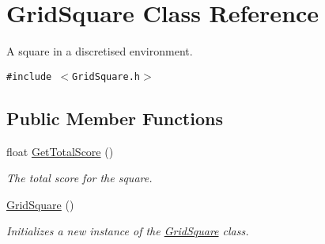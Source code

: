 \hypertarget{class_grid_square}{
\section{Grid\-Square Class Reference}
\label{class_grid_square}
}
A square in a discretised environment.  


{\tt \#include $<$Grid\-Square.h$>$}

\subsection*{Public Member Functions}
\begin{CompactItemize}
\item 
float \hyperlink{class_grid_square_6fdbfeb74b4d71ab4c3a2c57e003ccce}{Get\-Total\-Score} ()
\begin{CompactList}\small\item\em The total score for the square. \item\end{CompactList}\item 
\hyperlink{class_grid_square_17522bbd8d99669f23ce79cc016ff945}{Grid\-Square} ()
\begin{CompactList}\small\item\em Initializes a new instance of the \hyperlink{class_grid_square}{Grid\-Square} class. \item\end{CompactList}\end{CompactItemize}

